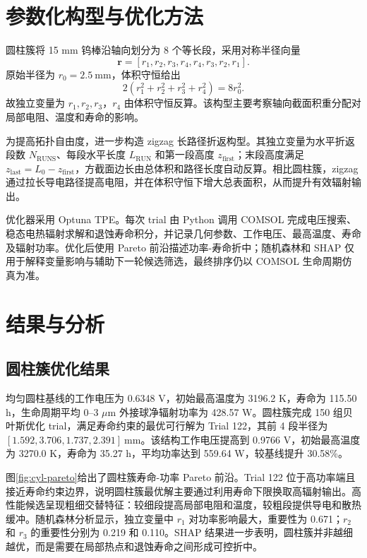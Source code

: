 \documentclass[10pt,twocolumn]{ctexart}
\begin{document}
\section{参数化构型与优化方法}
圆柱簇将 15 mm 钨棒沿轴向划分为 8 个等长段，采用对称半径向量
\begin{equation}
\mathbf r=[r_1,r_2,r_3,r_4,r_4,r_3,r_2,r_1].
\end{equation}
原始半径为 $r_0=2.5\ \mathrm{mm}$，体积守恒给出
\begin{equation}
2(r_1^2+r_2^2+r_3^2+r_4^2)=8r_0^2.
\end{equation}
故独立变量为 $r_1,r_2,r_3$，$r_4$ 由体积守恒反算。该构型主要考察轴向截面积重分配对局部电阻、温度和寿命的影响。

为提高拓扑自由度，进一步构造 zigzag 长路径折返构型。其独立变量为水平折返段数 $N_\mathrm{RUNS}$、每段水平长度 $L_\mathrm{RUN}$ 和第一段高度 $z_\mathrm{first}$；末段高度满足 $z_\mathrm{last}=L_0-z_\mathrm{first}$，方截面边长由总体积和路径长度自动反算。相比圆柱簇，zigzag 通过拉长导电路径提高电阻，并在体积守恒下增大总表面积，从而提升有效辐射输出。

优化器采用 Optuna TPE。每次 trial 由 Python 调用 COMSOL 完成电压搜索、稳态电热辐射求解和退蚀寿命积分，并记录几何参数、工作电压、最高温度、寿命及辐射功率。优化后使用 Pareto 前沿描述功率-寿命折中；随机森林和 SHAP 仅用于解释变量影响与辅助下一轮候选筛选，最终排序仍以 COMSOL 生命周期仿真为准。

\section{结果与分析}
\subsection{圆柱簇优化结果}
均匀圆柱基线的工作电压为 0.6348 V，初始最高温度为 3196.2 K，寿命为 115.50 h，生命周期平均 0--3 $\mu$m 外接球净辐射功率为 428.57 W。圆柱簇完成 150 组贝叶斯优化 trial，满足寿命约束的最优可行解为 Trial 122，其前 4 段半径为 $[1.592,3.706,1.737,2.391]\ \mathrm{mm}$。该结构工作电压提高到 0.9766 V，初始最高温度为 3270.0 K，寿命为 35.27 h，平均功率达到 559.64 W，较基线提升 30.58\%。

图\ref{fig:cyl-pareto}给出了圆柱簇寿命-功率 Pareto 前沿。Trial 122 位于高功率端且接近寿命约束边界，说明圆柱簇最优解主要通过利用寿命下限换取高辐射输出。高性能候选呈现粗细交替特征：较细段提高局部电阻和温度，较粗段提供导电和散热缓冲。随机森林分析显示，独立变量中 $r_1$ 对功率影响最大，重要性为 0.671；$r_2$ 和 $r_3$ 的重要性分别为 0.219 和 0.110。SHAP 结果进一步表明，圆柱簇并非越细越优，而是需要在局部热点和退蚀寿命之间形成可控折中。
\end{document}
